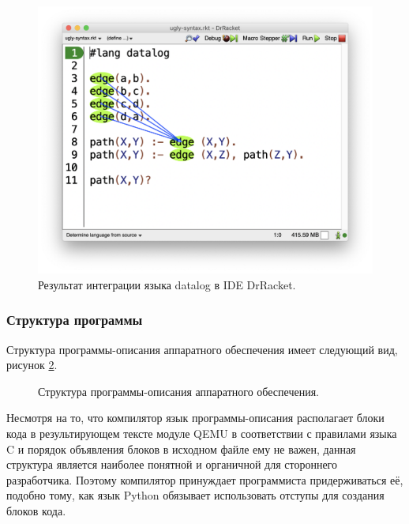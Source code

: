 \begin{figure}[!htbp]
    \centering
    \begin{adjustbox}{max totalsize={\textwidth}{\textheight}}
        \includegraphics[]{images/racket-variable-arrow.png}
    \end{adjustbox}
    \caption{Результат интеграции языка datalog в IDE DrRacket.}\label{fig:racket-variable-arrow}
\end{figure}


\subsubsection{Структура программы}\label{sec:ch2/sec1/sub1/sub1}

Структура программы-описания аппаратного обеспечения имеет следующий вид, рисунок \ref{fig:device-program-structure}.

\begin{figure}[!htbp]
    \centering
    
    \caption{Структура программы-описания аппаратного обеспечения.}\label{fig:device-program-structure}
\end{figure}

Несмотря на то, что компилятор язык программы-описания располагает
блоки кода в результирующем тексте модуле QEMU в соответствии
с правилами языка C и порядок объявления блоков в исходном файле ему не важен,
данная структура является наиболее понятной и органичной для стороннего разработчика.
Поэтому компилятор принуждает программиста придерживаться её, подобно тому, как
язык Python обязывает использовать отступы для создания блоков кода.


